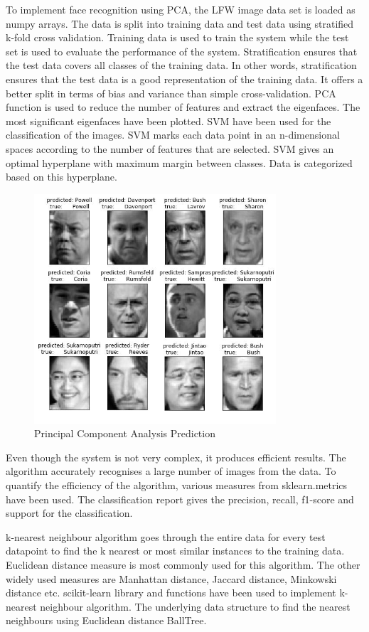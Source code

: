 \documentclass[conference]{IEEEtran}
\begin{document}
To implement face recognition using PCA, the LFW image data set is loaded as numpy arrays. The data is split into training data and test data using stratified k-fold cross validation. Training data is used to train the system while the test set is used to evaluate the performance of the system. Stratification ensures that the test data covers all classes of the training data. In other words, stratification ensures that the test data is a good representation of the training data. It offers a better split in terms of bias and variance than simple cross-validation. PCA function is used to reduce the number of features and extract the eigenfaces. The most significant eigenfaces have been plotted. SVM have been used for the classification of the images. SVM marks each data point in an n-dimensional spaces according to the number of features that are selected. SVM gives an optimal hyperplane with maximum margin between classes. Data is categorized based on this hyperplane.

\begin{figure}[h!]
 \centering
 \includegraphics[width = 9cm]{PCA_pred.JPG}
 \caption{ Principal Component Analysis Prediction}
 \label{fig 7: Principal Component Analysis Prediction}
\end{figure}

Even though the system is not very complex, it produces efficient results. The algorithm accurately recognises a large number of images from the data. To quantify the efficiency of the algorithm, various measures from sklearn.metrics have been used. The classification report gives the precision, recall, f1-score and support for the classification. 

k-nearest neighbour algorithm goes through the entire data for every test datapoint to find the k nearest or most similar instances to the training data. Euclidean distance measure is most commonly used for this algorithm. The other widely used measures are Manhattan distance, Jaccard distance, Minkowski distance etc. scikit-learn library and functions have been used to implement k-nearest neighbour algorithm. The underlying data structure to find the nearest neighbours using Euclidean distance BallTree. 
\end{document}

